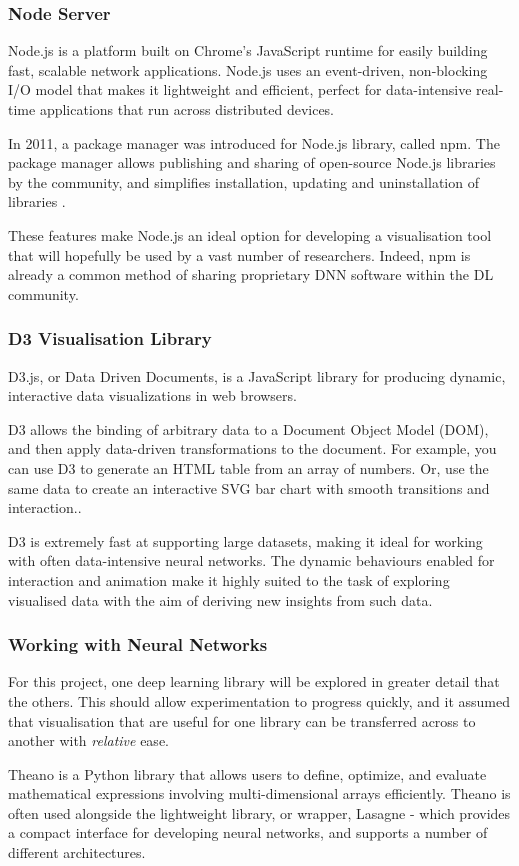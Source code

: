\documentclass[a4paper,11pt,titlepage]{article}
\begin{document}
		\subsubsection{Node Server}
		Node.js is a platform built on Chrome's JavaScript runtime for easily building fast, scalable network applications. Node.js uses an event-driven, non-blocking I/O model that makes it lightweight and efficient, perfect for data-intensive real-time applications that run across distributed devices.\cite{Dahl2009}
		\par 
		In 2011, a package manager was introduced for Node.js library, called npm. The package manager allows publishing and sharing of open-source Node.js libraries by the community, and simplifies installation, updating and uninstallation of libraries \cite{Dahl2009}.
		\par 
		These features make Node.js an ideal option for developing a visualisation tool that will hopefully be used by a vast number of researchers. Indeed, npm is already a common method of sharing proprietary DNN software within the DL community. 
		\subsubsection{D3 Visualisation Library}
		D3.js, or Data Driven Documents, is a JavaScript library for producing dynamic, interactive data visualizations in web browsers.
		\par 
		D3 allows the binding of arbitrary data to a Document Object Model (DOM), and then apply data-driven transformations to the document. For example, you can use D3 to generate an HTML table from an array of numbers. Or, use the same data to create an interactive SVG bar chart with smooth transitions and interaction.\cite{Bostock2011a}.
		\par
		D3 is extremely fast at supporting large datasets, making it ideal for working with often data-intensive neural networks. The dynamic behaviours enabled for interaction and animation make it highly suited to the task of exploring visualised data with the aim of deriving new insights from such data.
		\subsubsection{Working with Neural Networks}
		For this project, one deep learning library will be explored in greater detail that the others. This should allow experimentation to progress quickly, and it assumed that visualisation that are useful for one library can be transferred across to another with \textit{relative} ease.
		\par 
		Theano is a Python library that allows users to define, optimize, and evaluate mathematical expressions involving multi-dimensional arrays efficiently. Theano is often used alongside the lightweight library, or wrapper, Lasagne - which provides a compact interface for developing neural networks, and supports a number of different architectures.
		
\end{document}

